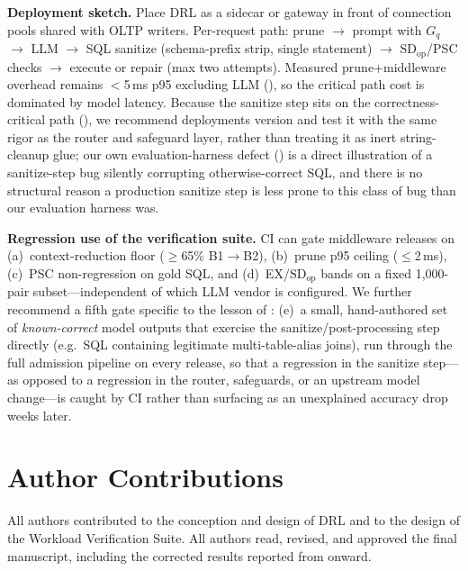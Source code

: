 \documentclass[twocolumn]{svjour3}
\begin{document}
\textbf{Deployment sketch.} Place DRL as a sidecar or gateway in front of connection pools shared with OLTP writers.
Per-request path: prune $\rightarrow$ prompt with $G_q$ $\rightarrow$ LLM $\rightarrow$ SQL sanitize (schema-prefix strip, single statement) $\rightarrow$ $\text{SD}_{\text{op}}$/PSC checks $\rightarrow$ execute or repair (max two attempts).
Measured prune+middleware overhead remains $<$5\,ms p95 excluding LLM (), so the critical path cost is dominated by model latency.
Because the sanitize step sits on the correctness-critical path (), we recommend deployments version and test it with the same rigor as the router and safeguard layer, rather than treating it as inert string-cleanup glue; our own evaluation-harness defect () is a direct illustration of a sanitize-step bug silently corrupting otherwise-correct SQL, and there is no structural reason a production sanitize step is less prone to this class of bug than our evaluation harness was.

\textbf{Regression use of the verification suite.}
CI can gate middleware releases on (a)~context-reduction floor ($\ge$65\% B1$\rightarrow$B2), (b)~prune p95 ceiling ($\le$2\,ms), (c)~PSC non-regression on gold SQL, and (d)~EX/$\text{SD}_{\text{op}}$ bands on a fixed 1{,}000-pair subset---independent of which LLM vendor is configured.
We further recommend a fifth gate specific to the lesson of : (e)~a small, hand-authored set of \emph{known-correct} model outputs that exercise the sanitize/post-processing step directly (e.g.\ SQL containing legitimate multi-table-alias joins), run through the full admission pipeline on every release, so that a regression in the sanitize step---as opposed to a regression in the router, safeguards, or an upstream model change---is caught by CI rather than surfacing as an unexplained accuracy drop weeks later.

\section*{Author Contributions}
All authors contributed to the conception and design of DRL and to the design of the Workload Verification Suite.
All authors read, revised, and approved the final manuscript, including the corrected results reported from  onward.

\end{document}
